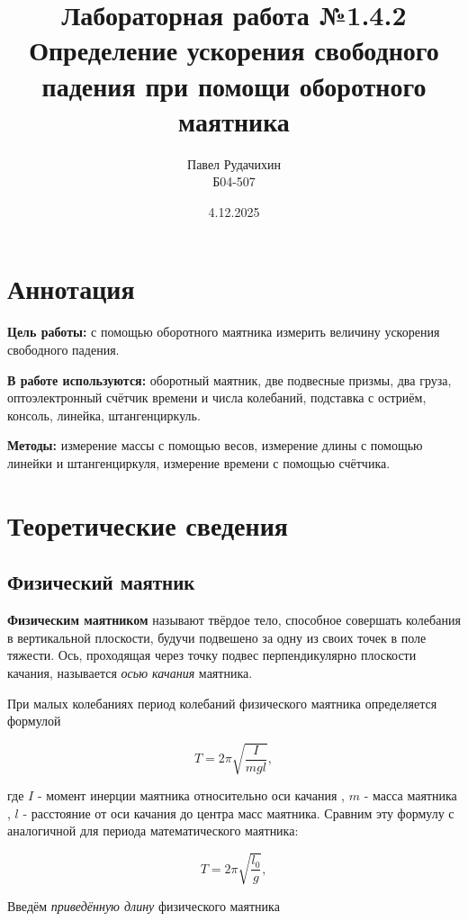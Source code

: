 \documentclass{article}
\title{Лабораторная работа №1.4.2 \\ Определение ускорения свободного падения при помощи оборотного маятника}
\author{Павел Рудачихин \\ Б04-507}
\date{4.12.2025}
\begin{document}
\maketitle{}
\section* {Аннотация} 

\hspace{4mm} \textbf{Цель работы:} с помощью оборотного маятника измерить величину ускорения свободного падения.

\textbf{В работе используются:} оборотный маятник, две подвесные призмы, два груза, оптоэлектронный счётчик времени и числа колебаний, подставка с остриём, консоль, линейка, штангенциркуль.

\textbf{Методы:} измерение массы с помощью весов, измерение длины с помощью линейки и штангенциркуля, измерение времени с помощью счётчика.

\section* {Теоретические сведения}

\subsection* {Физический маятник}

\hspace{4mm} \textbf{Физическим маятником} называют твёрдое тело, способное совершать 
колебания в вертикальной плоскости, будучи подвешено за одну из своих 
точек в поле тяжести. Ось, проходящая через точку подвес перпендикулярно плоскости качания, называется \textit{осью качания} маятника. 
 
При малых колебаниях период колебаний физического маятника определяется формулой 

\begin{equation}
	T = 2\pi \sqrt{\frac{I}{mgl}},
\end{equation}

где $I$ - момент инерции маятника относительно оси качания , $m$ - масса маятника , $l$ - расстояние от оси качания до центра масс маятника. Сравним эту формулу с аналогичной для периода математического маятника:

\begin{equation}
	T = 2\pi \sqrt{\frac{l_0}{g}},
\end{equation}

Введём \textit{приведённую длину} физического маятника
\end{document}
